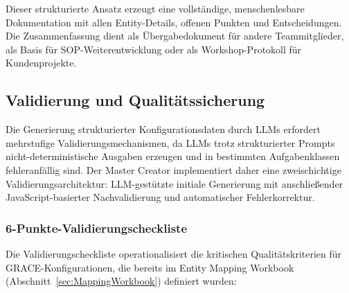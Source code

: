 \noindent Dieser strukturierte Ansatz erzeugt eine vollständige, menschenlesbare Dokumentation mit allen Entity-Details, offenen Punkten und Entscheidungen. Die Zusammenfassung dient als Übergabedokument für andere Teammitglieder, als Basis für SOP-Weiterentwicklung oder als Workshop-Protokoll für Kundenprojekte.


\subsection{Validierung und Qualitätssicherung}
\label{sec:Validierung}

Die Generierung strukturierter Konfigurationsdaten durch LLMs erfordert mehrstufige Validierungsmechanismen, da LLMs trotz strukturierter Prompts nicht-deterministische Ausgaben erzeugen und in bestimmten Aufgabenklassen fehleranfällig sind. Der Master Creator implementiert daher eine zweischichtige Validierungsarchitektur: LLM-gestützte initiale Generierung mit anschließender JavaScript-basierter Nachvalidierung und automatischer Fehlerkorrektur.

\subsubsection{6-Punkte-Validierungscheckliste}

Die Validierungscheckliste operationalisiert die kritischen Qualitätskriterien für GRACE-Konfigurationen, die bereits im Entity Mapping Workbook (Abschnitt~\ref{sec:MappingWorkbook}) definiert wurden:

